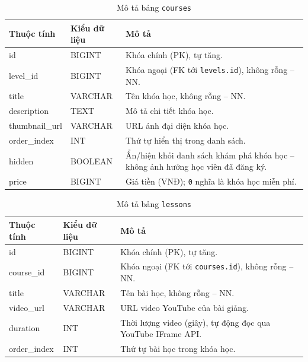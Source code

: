 \documentclass[../DoAn.tex]{subfiles}
\begin{document}
\begin{table}[H]
\centering
\small
\renewcommand{\arraystretch}{1.2}
\begin{tabular}{|p{3.2cm}|p{2.4cm}|p{8cm}|}
\hline
\textbf{Thuộc tính} & \textbf{Kiểu dữ liệu} & \textbf{Mô tả} \\ \hline
id & BIGINT & Khóa chính (PK), tự tăng. \\ \hline
level\_id & BIGINT & Khóa ngoại (FK tới \texttt{levels.id}), không rỗng -- NN. \\ \hline
title & VARCHAR & Tên khóa học, không rỗng -- NN. \\ \hline
description & TEXT & Mô tả chi tiết khóa học. \\ \hline
thumbnail\_url & VARCHAR & URL ảnh đại diện khóa học. \\ \hline
order\_index & INT & Thứ tự hiển thị trong danh sách. \\ \hline
hidden & BOOLEAN & Ẩn/hiện khỏi danh sách khám phá khóa học -- không ảnh hưởng học viên đã đăng ký. \\ \hline
price & BIGINT & Giá tiền (VNĐ); \texttt{0} nghĩa là khóa học miễn phí. \\ \hline
\end{tabular}
\renewcommand{\arraystretch}{1}
\caption{Mô tả bảng \texttt{courses}}
\label{table:db-courses}
\end{table}

\begin{table}[H]
\centering
\small
\renewcommand{\arraystretch}{1.2}
\begin{tabular}{|p{3.2cm}|p{2.4cm}|p{8cm}|}
\hline
\textbf{Thuộc tính} & \textbf{Kiểu dữ liệu} & \textbf{Mô tả} \\ \hline
id & BIGINT & Khóa chính (PK), tự tăng. \\ \hline
course\_id & BIGINT & Khóa ngoại (FK tới \texttt{courses.id}), không rỗng -- NN. \\ \hline
title & VARCHAR & Tên bài học, không rỗng -- NN. \\ \hline
video\_url & VARCHAR & URL video YouTube của bài giảng. \\ \hline
duration & INT & Thời lượng video (giây), tự động đọc qua YouTube IFrame API. \\ \hline
order\_index & INT & Thứ tự bài học trong khóa học. \\ \hline
\end{tabular}
\renewcommand{\arraystretch}{1}
\caption{Mô tả bảng \texttt{lessons}}
\label{table:db-lessons}
\end{table}
\end{document}

